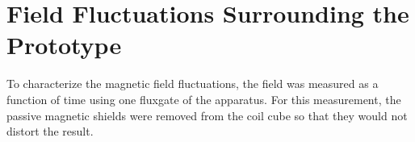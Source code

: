 








\section{Field Fluctuations Surrounding the Prototype}\label{sec:field}
 

To characterize the magnetic field fluctuations, the field was measured as a function of time using one fluxgate of the apparatus. For this measurement, the passive magnetic shields were removed from the coil cube so that they would not distort the result.

